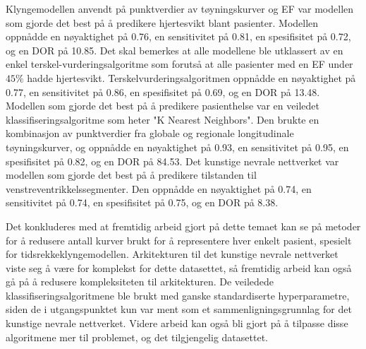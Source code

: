Klyngemodellen anvendt på punktverdier av tøyningskurver og EF var modellen som gjorde det best på å predikere hjertesvikt blant pasienter. Modellen oppnådde en nøyaktighet på 0.76, en sensitivitet på 0.81, en spesifisitet på 0.72, og en DOR på 10.85. Det skal bemerkes at alle modellene ble utklassert av en enkel terskel-vurderingsalgoritme som forutså at alle pasienter med en EF under $45\%$ hadde hjertesvikt. Terskelvurderingsalgoritmen oppnådde en nøyaktighet på 0.77, en sensitivitet på 0.86, en spesifisitet på 0.69, og en DOR på 13.48. Modellen som gjorde det best på å predikere pasienthelse var en veiledet klassifiseringsalgoritme som heter "K Nearest Neighbors". Den brukte en kombinasjon av punktverdier fra globale og regionale longitudinale tøyningskurver, og oppnådde en nøyaktighet på 0.93, en sensitivitet på 0.95, en spesifisitet på 0.82, og en DOR på 84.53. Det kunstige nevrale nettverket var modellen som gjorde det best på å predikere tilstanden til venstreventrikkelssegmenter. Den oppnådde en nøyaktighet på 0.74, en sensitivitet på 0.74, en spesifisitet på 0.75, og en DOR på 8.38. \bigskip

Det konkluderes med at fremtidig arbeid gjort på dette temaet kan se på metoder for å redusere antall kurver brukt for å representere hver enkelt pasient, spesielt for tidsrekkeklyngemodellen. Arkitekturen til det kunstige nevrale nettverket viste seg å være for komplekst for dette datasettet, så fremtidig arbeid kan også gå på å redusere kompleksiteten til arkitekturen. De veiledede klassifiseringsalgoritmene ble brukt med ganske standardiserte hyperparametre, siden de i utgangspunktet kun var ment som et sammenligningsgrunnlag for det kunstige nevrale nettverket. Videre arbeid kan også bli gjort på å tilpasse disse algoritmene mer til problemet, og det tilgjengelig datasettet.

\clearpage